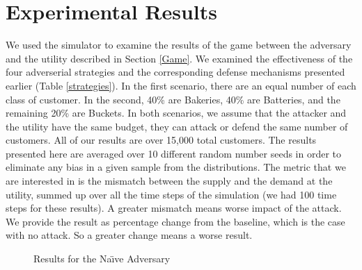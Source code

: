 \section{Experimental Results}
\label{Experimental Results}

We used the simulator to examine the results of the game between the adversary and the utility described in Section \ref{Game}. We examined the effectiveness of the four adverserial strategies and the corresponding defense mechanisms presented earlier (Table \ref{strategies}). In the first scenario, there are an equal number of each class of customer. In the second, 40\% are Bakeries, 40\% are Batteries, and the remaining 20\% are Buckets. In both scenarios, we assume that the attacker and the utility have the same budget, \ie they can attack or defend the same number of customers. All of our results are over 15,000 total customers. The results presented here are averaged over 10 different random number seeds in order to eliminate any bias in a given sample from the distributions. 
The metric that we are interested in is the mismatch between the supply and the demand at the utility, summed up over all the time steps of the simulation (we had 100 time steps for these results). A greater mismatch means worse impact of the attack. We provide the result as percentage change from the baseline, which is the case with no attack. So a greater change means a worse result. 

\begin{figure}[htp]
    \centering
    \hfill
    \caption{Results for the Na\"\i ve Adversary}
    \label{naive}  
\end{figure}

